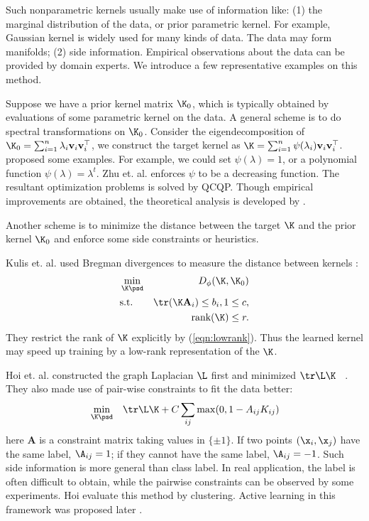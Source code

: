 Such nonparametric kernels usually make use of information like: (1) the marginal distribution of the data, or prior parametric kernel. For example, Gaussian kernel is widely used for many kinds of data. The data may form manifolds; (2) side information. Empirical observations about the data can be provided by domain experts. We introduce a few representative examples on this method.

Suppose we have a prior kernel matrix $\K_0$, which is typically obtained by evaluations of some parametric kernel on the data. A general scheme is to do spectral transformations on $\K_0$. Consider the eigendecomposition of $\K_0=\sum_{i=1}^n\lambda_i\mathbf v_i\mathbf v_i^\top$, we construct the target kernel as $\K=\sum_{i=1}^n\psi(\lambda_i)\mathbf v_i\mathbf v_i^\top$. \cite{nips/ChapelleWS02}\cite{kdd/HoiLC06} proposed some examples. For example, we could set $\psi(\lambda)=1$, or a polynomial function $\psi(\lambda)=\lambda^t$. Zhu et. al. enforces $\psi$ to be a decreasing function\cite{nips/ZhuKGL04}. The resultant optimization problems is solved by QCQP. Though empirical improvements are obtained, the theoretical analysis is developed by \cite{nips/ZhangA05,tit/JohnsonZ08}.

Another scheme is to minimize the distance between the target $\K$ and the prior kernel $\K_0$ and enforce some side constraints or heuristics.

Kulis et. al. used Bregman divergences to measure the distance between kernels \cite{icml/KulisSD06}:
\begin{eqnarray}
&\min_{\K\psd}& D_{\phi}(\K,\K_0)\\
&\mbox{s.t.}& \tr(\K\mathbf A_i)\leq b_i,1\leq c,\\
&&  \mbox{rank}(\K)\leq r \label{eqn:lowrank}.
\end{eqnarray}
They restrict the rank of $\K$ explicitly by (\ref{eqn:lowrank}). Thus the learned kernel may speed up training by a low-rank representation of the $\K$.

Hoi et. al. constructed the graph Laplacian $\L$ first and minimized $\tr \L\K$ ~\cite{icml/HoiJL07}. They also made use of pair-wise constraints to fit the data better:
\begin{eqnarray}
&\min_{\K\psd}& \tr \L\K+C\sum_{ij}\max(0,1-A_{ij}K_{ij})
\end{eqnarray}
here $\mathbf A$ is a constraint matrix taking values in $\{\pm1\}$. If two points $(\x_i,\x_j)$ have the same label, $\A_{ij}=1$; if they cannot have the same label, $\A_{ij}=-1$. Such side information is more general than class label. In real application, the label is often difficult to obtain, while the pairwise constraints can be observed by some experiments. Hoi evaluate this method by clustering. Active learning in this framework was proposed later \cite{icml/HoiJ08}.

